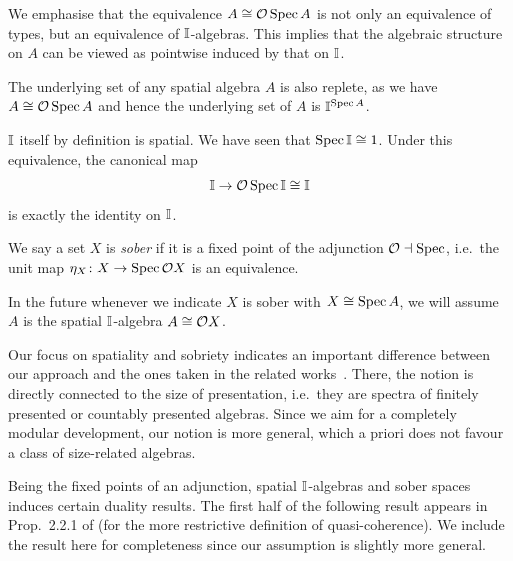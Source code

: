 We emphasise that the equivalence $A \cong \mathcal{O}\operatorname{Spec} A$ is not only an equivalence of types, but an equivalence of $\mathbb{I}$-algebras. This implies that the algebraic structure on $A$ can be viewed as pointwise induced by that on $\mathbb{I}$. 

\begin{remark}\label{rem:qcreplete}
  The underlying set of any spatial algebra $A$ is also replete, as we have $A\cong \mathcal{O}\operatorname{Spec}{A}$ and hence the underlying set of $A$ is $\mathbb{I}^{\operatorname{Spec}{A}}$.
\end{remark}

\begin{example}\label{exm:intervalqc}
  $\mathbb{I}$ itself by definition is spatial. We have seen that $\operatorname{Spec} \mathbb{I} \cong 1$. Under this equivalence, the canonical map 
  \[ \mathbb{I} \to \mathcal{O}\operatorname{Spec} \mathbb{I} \cong \mathbb{I} \]
  is exactly the identity on $\mathbb{I}$.
\end{example}

\begin{definition}
  We say a set $X$ is \emph{sober} if it is a fixed point of the adjunction $\mathcal{O} \dashv \operatorname{Spec}$, i.e.\ the unit map $\eta_X\colon X \to \operatorname{Spec}\mathcal{O} X$ is an equivalence.
\end{definition}

In the future whenever we indicate $X$ is sober with $X \cong \operatorname{Spec} A$, we will assume $A$ is the spatial $\mathbb{I}$-algebra $A \cong \mathcal{O} X$.

\begin{remark}
  Our focus on spatiality and sobriety indicates an important difference between our approach and the ones taken in the related works~\citep{Cherubini_Coquand_Hutzler_2024,cherubini2024foundation}. There, the notion is directly connected to the size of presentation, i.e.\ they are spectra of finitely presented or countably presented algebras. Since we aim for a completely modular development, our notion is more general, which a priori does not favour a class of size-related algebras. 
\end{remark}

Being the fixed points of an adjunction, spatial $\mathbb{I}$-algebras and sober spaces induces certain duality results. The first half of the following result appears in Prop.~2.2.1 of \citet{Cherubini_Coquand_Hutzler_2024} (for the more restrictive definition of quasi-coherence). We include the result here for completeness since our assumption is slightly more general.

